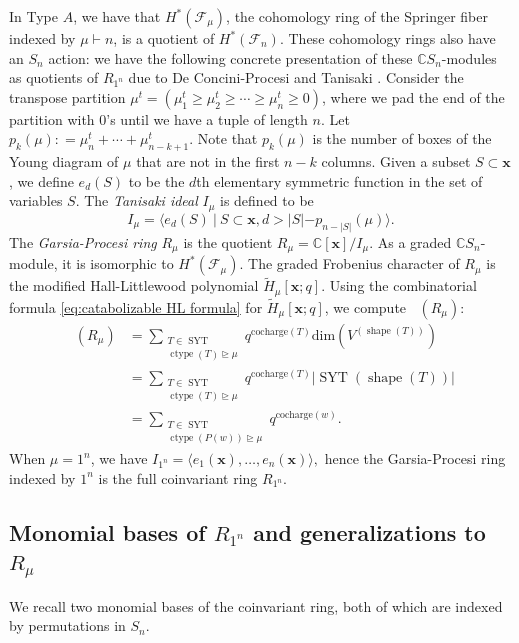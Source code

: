\documentclass[10pt]{amsart}
\theoremstyle{plain}
\theoremstyle{definition}
\theoremstyle{plain}
\theoremstyle{plain}
\theoremstyle{remark}
\theoremstyle{plain}
\theoremstyle{plain}
\DeclareMathOperator{\syt}{SYT}
\DeclareMathOperator{\ctype}{ctype}
\DeclareMathOperator{\Hilb}{Hilb}
\DeclareMathOperator{\shape}{shape}
\DeclareMathOperator{\Hilbq}{\Hilb_q}
\newcommand{\mHL}{\tilde{H}}
\begin{document}
In Type $A$, we have that $H^{\ast}(\mathcal{F}_\mu)$,  the cohomology ring of the Springer fiber indexed by $\mu\vdash n$, is a quotient of $H^{\ast}(\mathcal{F}_n)$. These cohomology rings also have an $S_n$ action: we have the following concrete presentation of these $\mathbb{C}S_n$-modules as quotients of $R_{1^n}$ due to De Concini-Procesi \cite{deCon-Proc} and Tanisaki \cite{Tanisaki}. 
 Consider the transpose partition $\mu^{t} = (\mu^t_1 \geq \mu^t_2 \geq \cdots \geq  \mu^t_n \geq  0)$, where we pad the end of the partition with $0$'s until we have a tuple of length $n$. Let $p_k (\mu) : =\mu^t_n + \cdots + \mu^t_{n-k+1}$. Note that $p_k(\mu)$ is the number of boxes of the Young diagram of $\mu$ that are not in the first $n-k$ columns.  Given a subset $S\subset \mathbf{x}$, we define $e_d(S)$ to be the $d$th elementary symmetric function in the set of variables  $S$. 
The \textit{Tanisaki ideal} $I_\mu$ is defined to be
\[I_\mu = \langle e_d(S) \ | \ S\subset \mathbf{x}, d> |S| -p_{n-|S|}(\mu) \rangle .\]
The \textit{Garsia-Procesi ring} $R_\mu$ is the quotient  $R_\mu = \mathbb{C}[\mathbf{x}]/I_\mu$.
As a graded $\mathbb{C}S_n$-module, it is isomorphic to $H^{\ast}(\mathcal{F}_\mu)$.
The graded Frobenius character of $R_\mu$ is the modified Hall-Littlewood polynomial $\mHL_{\mu}[\mathbf{x};q]$.
Using the combinatorial formula \eqref{eq:catabolizable HL formula} for $\mHL_{\mu}[\mathbf{x};q]$, we compute $\Hilbq(R_\mu)$:
\begin{align}
     \Hilbq(R_{\mu}) &= \sum\limits_{\substack{T\in \syt\\  \ctype(T)\unrhd\mu}} q^{\text{cocharge}(T)} \text{dim} (V^{(\shape(T))}) \nonumber\\&=  \sum\limits_{\substack{T\in \syt\\  \ctype(T)\unrhd\mu}}  q^{\text{cocharge}(T)} |\syt(\shape(T))| \nonumber \\&=  \sum\limits_{\substack{T\in \syt\\  \ctype(P(w))\unrhd\mu}}  q^{\text{cocharge}(w)}\label{eq:Hilb of R_mu}.
\end{align}
When $\mu = 1^n$, we have $I_{1^n} = \langle e_1(\mathbf{x}),\dots, e_n(\mathbf{x})\rangle,$ hence the Garsia-Procesi ring indexed by $1^n$ is the full coinvariant ring $R_{1^n}$.

\subsection{Monomial bases of \texorpdfstring{$R_{1^n}$}{R\_\{1\^n\}} and generalizations to \texorpdfstring{$R_{\mu}$}{R\_mu}}
We recall two monomial bases of the coinvariant ring, both of which are indexed by permutations in $S_n$.
\end{document}
